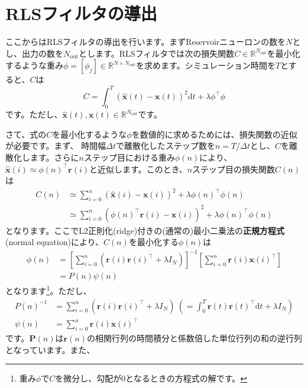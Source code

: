\section{RLSフィルタの導出}
ここからはRLSフィルタの導出を行います。まずReservoirニューロンの数を$N$とし、出力の数を$N_\text{out}$とします。RLSフィルタでは次の損失関数$C\in \mathbb{R}^{N_\text{out}}$を最小化するような重み$\phi=[\phi_j]\in \mathbb{R}^{N\times N_\text{out}}$を求めます。シミュレーション時間を$T$とすると、$C$は
\begin{equation}
C=\int_{0}^T(\hat{\boldsymbol{x}}(t)-\boldsymbol{x}(t))^{2} \mathrm{d} t+\lambda \phi^\intercal \phi
\end{equation}
です。ただし、$\hat{\boldsymbol{x}}(t), \boldsymbol{x}(t) \in \mathbb{R}^{N_\text{out}}$です。\par
さて、式の$C$を最小化するような$\phi$を数値的に求めるためには、損失関数の近似が必要です。まず、
時間幅$\Delta t$で離散化したステップ数を$n=T/\Delta t$とし、$C$を離散化します。さらに$n$ステップ目における重み$\phi(n)$により、$\hat{\boldsymbol{x}}(i)\simeq \phi(n)^\intercal \boldsymbol{r}(i)$と近似します。このとき、$n$ステップ目の損失関数$C(n)$は
\begin{align}
C(n)&\simeq \sum_{i=0}^{n}(\hat{\boldsymbol{x}}(i)-\boldsymbol{x}(i))^{2}+\lambda \phi(n)^\intercal \phi(n)\\     
&\simeq \sum_{i=0}^{n}(\phi(n)^\intercal \boldsymbol{r}(i)-\boldsymbol{x}(i))^{2}+\lambda \phi(n)^\intercal \phi(n)
\end{align}
となります。ここでL2正則化(ridge)付きの(通常の)最小二乗法の\textbf{正規方程式}(normal equation)により、$C(n)$を最小化する$\phi(n)$は
\begin{align}
\phi(n) &= \left[\sum_{i=0}^{n}(\boldsymbol{r}(i)\boldsymbol{r}(i)^\intercal+\lambda I_N)\right]^{-1}\left[\sum_{i=0}^{n}\boldsymbol{r}(i)\boldsymbol{x}(i)^\intercal\right]\\
&=P(n)\psi(n)
\end{align}
となります\footnote{重み$\phi$で$C$を微分し、勾配が0となるときの方程式の解です。}。ただし、
\begin{align}
P(n)^{-1}&= \sum_{i=0}^{n}(\boldsymbol{r}(i)\boldsymbol{r}(i)^\intercal+\lambda I_N)\ \left(=\int_{0}^T \boldsymbol{r}(t) \boldsymbol{r}(t)^\intercal \mathrm{d} t+\lambda I_{N}\right)\\
\psi(n)&=\sum_{i=0}^{n}\boldsymbol{r}(i)\boldsymbol{x}(i)^\intercal
\end{align}
です。$\boldsymbol{P}(n)$は$\boldsymbol{r}(n)$の相関行列の時間積分と係数倍した単位行列の和の逆行列となっています。また、
